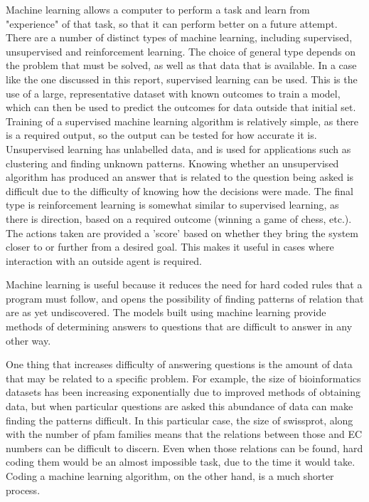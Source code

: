 \documentclass[12pt]{report}
\begin{document}
		Machine learning allows a computer to perform a task and learn from "experience" of that task, so that it can perform better on a future attempt.  There are a number of distinct types of machine learning, including supervised, unsupervised and reinforcement learning.  The choice of general type depends on the problem that must be solved, as well as that data that is available.  In a case like the one discussed in this report, supervised learning can be used.  This is the use of a large, representative dataset with known outcomes to train a model, which can then be used to predict the outcomes for data outside that initial set.  Training of a supervised machine learning algorithm is relatively simple, as there is a required output, so the output can be tested for how accurate it is.  Unsupervised learning has unlabelled data, and is used for applications such as clustering and finding unknown patterns.  Knowing whether an unsupervised algorithm has produced an answer that is related to the question being asked is difficult due to the difficulty of knowing how the decisions were made.  The final type is reinforcement learning is somewhat similar to supervised learning, as there is direction, based on a required outcome (winning a game of chess, etc.).  The actions taken are provided a 'score' based on whether they bring the system closer to or further from a desired goal.  This makes it useful in cases where interaction with an outside agent is required.
		
		Machine learning is useful because it reduces the need for hard coded rules that a program must follow, and opens the possibility of finding patterns of relation that are as yet undiscovered.  The models built using machine learning provide methods of determining answers to questions that are difficult to answer in any other way.  
		
		One thing that increases difficulty of answering questions is the amount of data that may be related to a specific problem.  For example, the size of bioinformatics datasets has been increasing exponentially due to improved methods of obtaining data, but when particular questions are asked this abundance of data can make finding the patterns difficult.  In this particular case, the size of swissprot, along with the number of pfam families means that the relations between those and EC numbers can be difficult to discern.  Even when those relations can be found, hard coding them would be an almost impossible task, due to the time it would take.  Coding a machine learning algorithm, on the other hand, is a much shorter process.
		
\end{document}
